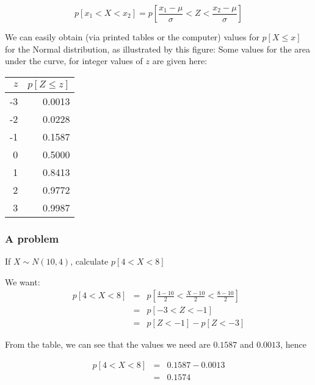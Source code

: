 \documentclass[12pt]{extbook}
\begin{document}
\begin{displaymath}
p[x_1 < X < x_2] = p \left[ \frac{x_1-\mu}{\sigma} < Z < \frac{x_2 -\mu}{\sigma} \right]
\end{displaymath}

We can easily obtain (via printed tables or the computer) values for $p[X \leq x]$ for the Normal distribution, as illustrated by this figure:
Some values for the area under the curve, for integer values of $z$ are given here:

\begin{tiny}
\begin{center}
\begin{tabular}{rr}
  \hline
  $z$ & $p[Z \leq z]$ \\ 
  \hline
 -3 & 0.0013 \\ 
 -2 & 0.0228 \\ 
 -1 & 0.1587 \\ 
  0 & 0.5000 \\ 
  1 & 0.8413 \\ 
  2 & 0.9772 \\ 
  3 & 0.9987 \\ 
   \hline
\end{tabular}
\end{center}
\end{tiny}

\newpage
\subsubsection{A problem}

If $X \sim N(10,4)$, calculate $p[4 < X < 8]$

We want:
\begin{eqnarray*}
p[4 < X < 8] &=& p \left[ \frac{4-10}{2} < \frac{X-10}{2} < \frac{8-10}{2} \right]\\
&=& p[-3 < Z < -1]\\
&=& p[Z < -1] - p[Z < -3]
\end{eqnarray*}

From the table, we can see that the values we need are $0.1587$ and $0.0013$, hence

\begin{eqnarray*}
p[4 < X < 8] &=& 0.1587-0.0013\\
 &=& 0.1574
\end{eqnarray*}
\end{document}
